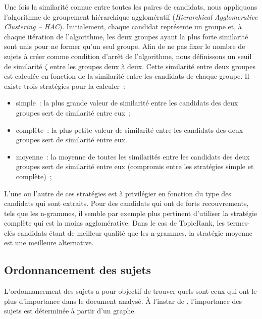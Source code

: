     Une fois la similarité connue entre toutes les paires de candidats, nous
    appliquons l'algorithme de groupement hiérarchique agglomératif
    (\textit{Hierarchical Agglomerative Clustering -- HAC}). Initialement,
    chaque candidat représente un groupe et, à chaque itération de l'algorithme,
    les deux groupes ayant la plus forte similarité sont unis pour ne former
    qu'un seul groupe. Afin de ne pas fixer le nombre de sujets à créer comme
    condition d'arrêt de l'algorithme, nous définissons un seuil de similarité
    $\zeta$ entre les groupes deux à deux. Cette similarité entre deux groupes
    est calculée en fonction de la similarité entre les candidats de chaque
    groupe. Il existe trois stratégies pour la calculer~:
    \begin{itemize}
      \item{simple~: la plus grande valeur de similarité entre les candidats
            des deux groupes sert de similarité entre eux~;}
      \item{complète~: la plus petite valeur de similarité entre les candidats
            des deux groupes sert de similarité entre eux.}
      \item{moyenne~: la moyenne de toutes les similarités entre les
            candidats des deux groupes sert de similarité entre eux (compromis
            entre les stratégies simple et complète)~;}
    \end{itemize}
    L'une ou l'autre de ces stratégies est à privilégier en fonction du type des
    candidats qui sont extraits. Pour des candidats qui ont de forts
    recouvrements, tels que les n-grammes, il semble par exemple plus pertinent
    d'utiliser la stratégie complète qui est la moins agglomérative. Dans le cas
    de TopicRank, les termes-clés candidats étant de meilleur qualité que les
    n-grammes, la stratégie moyenne est une meilleure alternative.

  \subsection{Ordonnancement des sujets}
  \label{subsec:ordonnancement_des_sujets}
    L'ordonnancement des sujets a pour objectif de trouver quels sont ceux qui
    ont le plus d'importance dans le document analysé. À l'instar de
    , l'importance des sujets est déterminée à
    partir d'un graphe.

